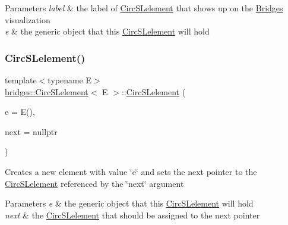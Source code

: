 \begin{DoxyParams}{Parameters}
{\em label} & the label of \mbox{\hyperlink{classbridges_1_1_circ_s_lelement}{Circ\+S\+Lelement}} that shows up on the \mbox{\hyperlink{namespacebridges_1_1_bridges}{Bridges}} visualization \\
\hline
{\em e} & the generic object that this \mbox{\hyperlink{classbridges_1_1_circ_s_lelement}{Circ\+S\+Lelement}} will hold \\
\hline
\end{DoxyParams}
\mbox{\label{classbridges_1_1_circ_s_lelement_a0dd7605959b4b52de041e9bcbe5abce7}} 
\subsubsection{\texorpdfstring{Circ\+S\+Lelement()}{CircSLelement()}\hspace{0.1cm}{\footnotesize\ttfamily [7/8]}}
{\footnotesize\ttfamily template$<$typename E$>$ \\
\mbox{\hyperlink{classbridges_1_1_circ_s_lelement}{bridges\+::\+Circ\+S\+Lelement}}$<$ E $>$\+::\mbox{\hyperlink{classbridges_1_1_circ_s_lelement}{Circ\+S\+Lelement}} (\begin{DoxyParamCaption}\item[{E}]{e = {\ttfamily E()},  }\item[{\mbox{\hyperlink{classbridges_1_1_circ_s_lelement}{Circ\+S\+Lelement}}$<$ E $>$ $\ast$}]{next = {\ttfamily nullptr} }\end{DoxyParamCaption})\hspace{0.3cm}{\ttfamily [inline]}}

Creates a new element with value \char`\"{}e\char`\"{} and sets the next pointer to the \mbox{\hyperlink{classbridges_1_1_circ_s_lelement}{Circ\+S\+Lelement}} referenced by the \char`\"{}next\char`\"{} argument


\begin{DoxyParams}{Parameters}
{\em e} & the generic object that this \mbox{\hyperlink{classbridges_1_1_circ_s_lelement}{Circ\+S\+Lelement}} will hold \\
\hline
{\em next} & the \mbox{\hyperlink{classbridges_1_1_circ_s_lelement}{Circ\+S\+Lelement}} that should be assigned to the next pointer \\
\hline
\end{DoxyParams}
\mbox{\label{classbridges_1_1_circ_s_lelement_a1fda146fc0da1d8c7d6440cbbbb2ce42}} 
